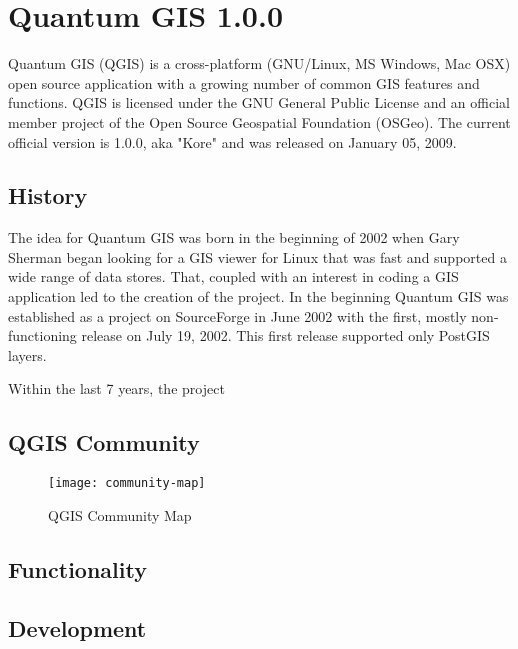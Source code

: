 \section{Quantum GIS 1.0.0}
\setcounter{page}{1}

Quantum GIS (QGIS) is a cross-platform (GNU/Linux, MS Windows, Mac OSX) open
source application with a growing number of common GIS features and
functions. QGIS is licensed under the GNU General Public License and an
official member project of the Open Source Geospatial Foundation (OSGeo). The
current official version is 1.0.0, aka "Kore" and was released on January 05,
2009. 

\subsection{History}

The idea for Quantum GIS was born in the beginning of 2002 when Gary Sherman
began looking for a GIS viewer for Linux that was fast and supported a wide
range of data stores. That, coupled with an interest in coding a GIS
application led to the creation of the project. In the beginning Quantum GIS
was established as a project on SourceForge in June 2002 with the first,
mostly non-functioning release on July 19, 2002. This first release supported
only PostGIS layers.

Within the last 7 years, the project 

\subsection{QGIS Community}

\begin{figure}[h]
   \begin{center}
   \caption{QGIS Community Map}\label{fig:community-map}\smallskip
   \texttt{[image: community-map]}
\end{center}
\end{figure}

\subsection{Functionality}



\subsection{Development}

